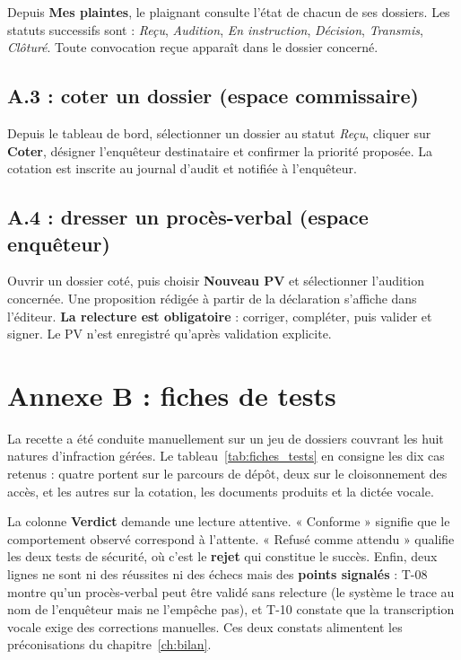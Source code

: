 Depuis \textbf{Mes plaintes}, le plaignant consulte l'état de chacun de ses dossiers. Les statuts successifs sont : \textit{Reçu}, \textit{Audition}, \textit{En instruction}, \textit{Décision}, \textit{Transmis}, \textit{Clôturé}. Toute convocation reçue apparaît dans le dossier concerné.

\subsection*{A.3 : coter un dossier (espace commissaire)}

Depuis le tableau de bord, sélectionner un dossier au statut \textit{Reçu}, cliquer sur \textbf{Coter}, désigner l'enquêteur destinataire et confirmer la priorité proposée. La cotation est inscrite au journal d'audit et notifiée à l'enquêteur.

\subsection*{A.4 : dresser un procès-verbal (espace enquêteur)}

Ouvrir un dossier coté, puis choisir \textbf{Nouveau PV} et sélectionner l'audition concernée. Une proposition rédigée à partir de la déclaration s'affiche dans l'éditeur. \textbf{La relecture est obligatoire} : corriger, compléter, puis valider et signer. Le PV n'est enregistré qu'après validation explicite.

\section*{Annexe B : fiches de tests}

La recette a été conduite manuellement sur un jeu de dossiers couvrant les huit natures d'infraction gérées. Le tableau~\ref{tab:fiches_tests} en consigne les dix cas retenus : quatre portent sur le parcours de dépôt, deux sur le cloisonnement des accès, et les autres sur la cotation, les documents produits et la dictée vocale.

La colonne \textbf{Verdict} demande une lecture attentive. « Conforme » signifie que le comportement observé correspond à l'attente. « Refusé comme attendu » qualifie les deux tests de sécurité, où c'est le \textbf{rejet} qui constitue le succès. Enfin, deux lignes ne sont ni des réussites ni des échecs mais des \textbf{points signalés} : T-08 montre qu'un procès-verbal peut être validé sans relecture (le système le trace au nom de l'enquêteur mais ne l'empêche pas), et T-10 constate que la transcription vocale exige des corrections manuelles. Ces deux constats alimentent les préconisations du chapitre~\ref{ch:bilan}.

